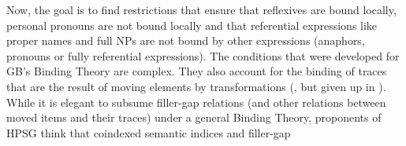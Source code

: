 \documentclass[output=paper
	        ,collection
	        ,collectionchapter
 	        ,biblatex
                ,babelshorthands
                ,newtxmath
                ,draftmode
                ,colorlinks, citecolor=brown
]{langscibook}
\begin{document}
Now, the goal is to find restrictions that ensure that reflexives are bound locally, personal
pronouns are not bound locally and that referential expressions like proper names and full NPs are
not bound by other expressions (anaphors, pronouns or fully referential expressions). The conditions that were developed for
GB's Binding Theory are complex. They also account for the binding of traces that are the result of
moving elements by transformations (\citealp{Chomsky81a}, but given up in
\citealp{Chomsky86a}). While it is elegant to subsume filler-gap relations (and other relations
between moved items and their traces) under a general Binding Theory, proponents of HPSG think that
coindexed semantic indices and filler-gap
\end{document}
